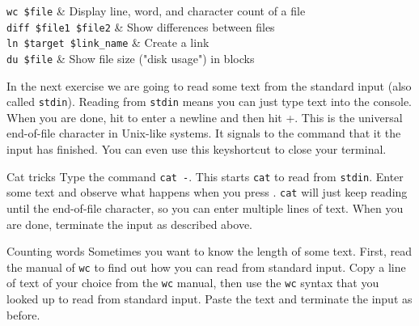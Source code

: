\documentclass{TheAlternativeCourse}
\begin{document}
\begin{table}[H]
    \centering
    \begin{tcolorbox}[%
        enhanced,
        fuzzy shadow={1mm}{-1mm}{0mm}{0.1mm}{black!50!white},
        width=1.0\linewidth,
        tabularx={>{\centering\arraybackslash}l|>{\centering\arraybackslash}X},
        title={Commands for getting info about files}]
	    \texttt{wc \$file} & Display line, word, and character count of a file \\
	    \texttt{diff \$file1 \$file2} & Show differences between files\\
	    \texttt{ln \$target \$link\_name} & Create a link\\
	    \texttt{du \$file} & Show file size ("disk usage") in blocks\\
    \end{tcolorbox}%
    \label{tab5}
\end{table}
%
In the next exercise we are going to read some text from the standard input (also called \texttt{stdin}). Reading from \texttt{stdin} means you can just type text into the console. When you are done, hit  to enter a newline and then hit \keys{\ctrl}+. This is the universal end-of-file character in Unix-like systems. It signals to the command that it the input has finished. You can even use this keyshortcut to close your terminal.

\begin{exercisebox}{Cat tricks}
	Type the command \texttt{cat -}. This starts \texttt{cat} to read from \texttt{stdin}. Enter some text and observe what happens when you press . \texttt{cat} will just keep reading until the end-of-file character, so you can enter multiple lines of text. When you are done, terminate the input as described above.
\end{exercisebox}

\begin{exercisebox}{Counting words}
	Sometimes you want to know the length of some text. First, read the manual of \texttt{wc} to find out how you can read from standard input. Copy a line of text of your choice from the \texttt{wc} manual, then use the \texttt{wc} syntax that you looked up to read from standard input. Paste the text and terminate the input as before.
\end{exercisebox}

\end{document}
